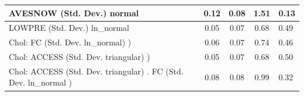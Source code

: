 \begin{table}
\begin{center}
\begin{tabular}{|l|l|c|c|c|l|}
			\hline
			AVESNOW (Std. Dev.) normal &  & 0.12 & 0.08 & 1.51 & 0.13 \\
			\hline
			LOWPRE (Std. Dev.) ln_normal &  & 0.05 & 0.07 & 0.68 & 0.49 \\
			\hline
			 Chol: FC (Std. Dev. ln_normal) ) &  & 0.06 & 0.07 & 0.74 & 0.46 \\
			\hline
			 Chol: ACCESS (Std. Dev. triangular) ) &  & 0.05 & 0.07 & 0.68 & 0.50 \\
			\hline
			 Chol: ACCESS (Std. Dev. triangular) . FC (Std. Dev.   ln_normal ) &  & 0.08 & 0.08 & 0.99 & 0.32 \\
			\hline
		\end{tabular}
	\end{center}
\end{table}